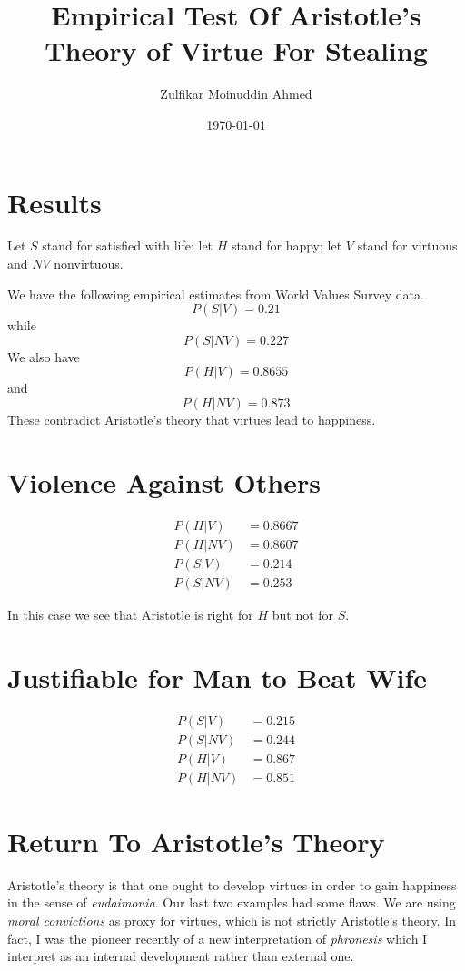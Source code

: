 \documentclass{amsart}
\title{Empirical Test Of Aristotle's Theory of Virtue For Stealing}
\author{Zulfikar Moinuddin Ahmed}
\date{\today}
\begin{document}
\maketitle

\section{Results}

Let $S$ stand for satisfied with life; let $H$ stand for happy; let $V$ stand for virtuous and $NV$ nonvirtuous.  

We have the following empirical estimates from World Values Survey data.
\[
P(S|V) = 0.21
\]
while
\[
P(S| NV) = 0.227
\]
We also have
\[
P( H | V ) = 0.8655
\]
and
\[
P( H | NV ) = 0.873
\]
These contradict Aristotle's theory that virtues lead to happiness.

\section{Violence Against Others}

\begin{eqnarray*}
P(H|V) &= 0.8667\\
P(H|NV) &= 0.8607\\
P(S|V) &= 0.214\\
P(S|NV) &= 0.253
\end{eqnarray*}

In this case we see that Aristotle is right for $H$ but not for $S$.

\section{Justifiable for Man to Beat Wife}

\begin{eqnarray*}
P(S|V) &= 0.215\\
P(S|NV) &= 0.244\\
P(H|V) &= 0.867\\
P(H|NV) &= 0.851
\end{eqnarray*}

\section{Return To Aristotle's Theory}

Aristotle's theory is that one ought to develop virtues in order to gain happiness in the sense of {\em eudaimonia}.  Our last two examples had some flaws.  We are using {\em moral convictions} as proxy for virtues, which is not strictly Aristotle's theory.  In fact, I was the pioneer recently of a new interpretation of {\em phronesis} which I interpret as an internal development rather than external one.
\end{document}
